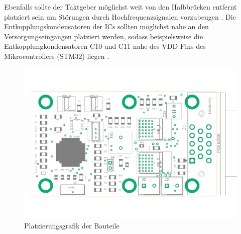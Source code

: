 Ebenfalls sollte der Taktgeber möglichst weit von den Halbbrücken entfernt platziert sein um Störungen durch Hochfrequenzsignalen vorzubeugen \cite[S.31]{stmquarz}.
Die Entkopplungskondensatoren der ICs sollten möglichst nahe an den Versorgungseingängen platziert werden, sodass beispielsweise die Entkopplungkondensatoren C10 und C11 nahe des VDD Pins des Mikrocontrollers (STM32) liegen \cite[S.17]{emcdes}.

\begin{figure}[H]%
\centering
\includegraphics[width=380pt]{./Bilder/docu}%
\caption{Platzierungsgrafik der Bauteile}%
\label{fig:docu}%
\end{figure}

